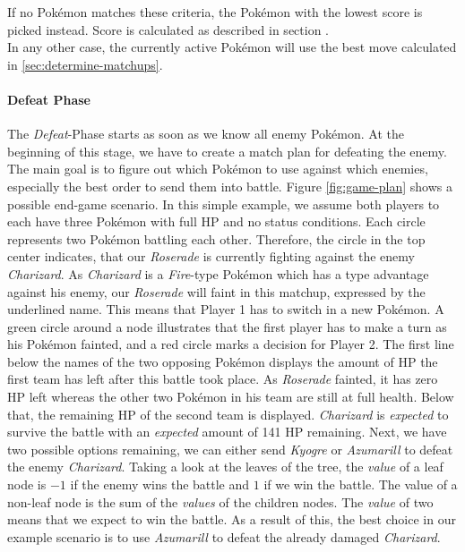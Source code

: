 If no Pokémon matches these criteria, the Pokémon with the lowest score is picked instead.
Score is calculated as described in section . \\
In any other case, the currently active Pokémon will use the best move calculated in \ref{sec:determine-matchups}.

\paragraph{Defeat Phase}
\label{sec:defeat-phase}
The \textit{Defeat}-Phase starts as soon as we know all enemy Pokémon. At the beginning of this stage, we have to create
a match plan for defeating the enemy. The main goal is to figure out which Pokémon to use against which enemies, especially
the best order to send them into battle. 
Figure \ref{fig:game-plan} shows a possible end-game scenario. In this simple example, we assume both players to each
have three Pokémon with full \ac{HP} and no status conditions. Each circle represents two Pokémon battling each other.
Therefore, the circle in the top center indicates, that our \textit{Roserade} is currently fighting against the enemy
\textit{Charizard}. As \textit{Charizard} is a \textit{Fire}-type Pokémon which has a type advantage against his enemy,
our \textit{Roserade} will faint in this matchup, expressed by the underlined name. This means that Player 1 has to
switch in a new Pokémon. A green circle around a node illustrates that the first player has to make a turn as his 
Pokémon fainted, and a red circle marks a decision for Player 2. The first line below the names of the two opposing
Pokémon displays the amount of \ac{HP} the first team has left after this battle took place. As \textit{Roserade} fainted,
it has zero \ac{HP} left whereas the other two Pokémon in his team are still at full health. Below that, the remaining 
\ac{HP} of the second team is displayed. \textit{Charizard} is \textit{expected} to survive the battle with an 
\textit{expected} amount of 141 \ac{HP} remaining. Next, we have two possible options remaining, we can either send
\textit{Kyogre} or \textit{Azumarill} to defeat the enemy \textit{Charizard}. Taking a look at the leaves of the tree,
the \textit{value} of a leaf node is $-1$ if the enemy wins the battle and $1$ if we win the battle. 
The value of a non-leaf node is the sum of the \textit{values} of the children nodes. The \textit{value} of two means that we 
expect to win the battle. As a result of this, the best choice in our example scenario is to use \textit{Azumarill} to 
defeat the already damaged \textit{Charizard}.

